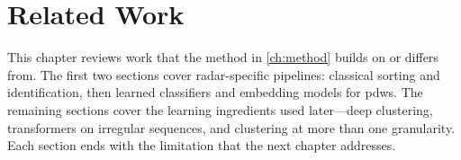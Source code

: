 \documentclass[../../main.tex]{subfiles}
\begin{document}
\chapter{Related Work}\label{ch:related_work}

This chapter reviews work that the method in \cref{ch:method} builds on or differs from.
The first two sections cover radar-specific pipelines: classical sorting and identification, then learned classifiers and embedding models for \glspl{pdw}.
The remaining sections cover the learning ingredients used later---deep clustering, transformers on irregular sequences, and clustering at more than one granularity.
Each section ends with the limitation that the next chapter addresses.






\end{document}
